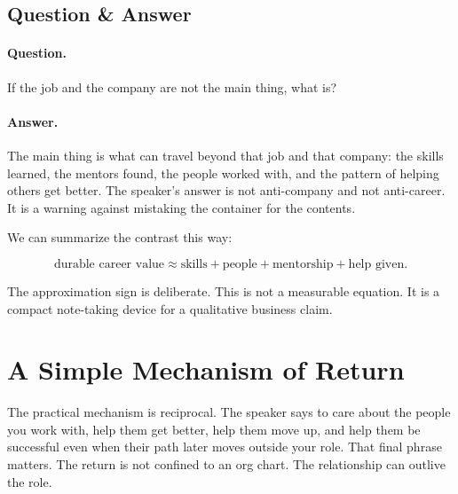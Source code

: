 \subsection{Question \& Answer}

\paragraph{Question.}
If the job and the company are not the main thing, what is?

\paragraph{Answer.}
The main thing is what can travel beyond that job and that company: the skills learned, the mentors found, the people worked with, and the pattern of helping others get better. The speaker's answer is not anti-company and not anti-career. It is a warning against mistaking the container for the contents.

We can summarize the contrast this way:

\[
\text{durable career value}
\approx
\text{skills}
+
\text{people}
+
\text{mentorship}
+
\text{help given}.
\]

The approximation sign is deliberate. This is not a measurable equation. It is a compact note-taking device for a qualitative business claim.

\section{A Simple Mechanism of Return}

The practical mechanism is reciprocal. The speaker says to care about the people you work with, help them get better, help them move up, and help them be successful even when their path later moves outside your role. That final phrase matters. The return is not confined to an org chart. The relationship can outlive the role.

